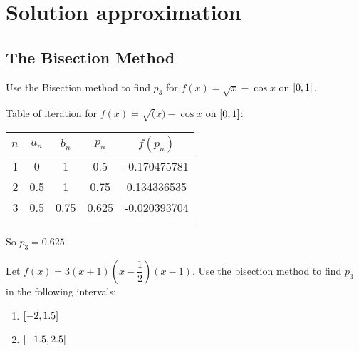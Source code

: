 \documentclass[../../Assignments.tex]{subfiles}
\begin{document}
\chapter{Solution approximation}

\section{The Bisection Method}

\begin{exercise}
    Use the Bisection method to find \(p_3\) for \(f(x) = \sqrt{x} - \cos{x}\) on \(\interval{0}{1}\).
\end{exercise}

\begin{solution}
    Table of iteration for \(f(x) = \sqrt(x) - \cos{x}\) on \(\interval{0}{1}\):

    \begin{tabular}{r S[table-format=1.1] S[table-format=1.2] S[table-format=1.3] S[table-format=-1.9]}
        \\
        \toprule
        \(n\)  &  {\(a_n\)}  &  {\(b_n\)}  &  {\(p_n\)}  &  {\(f(p_n)\)}  \\
          &  0          &  1          &  0.5        &  -0.170475781  \\
            2  &  0.5        &  1          &  0.75       &   0.134336535  \\
            3  &  0.5        &  0.75       &  0.625      &  -0.020393704  \\
        \bottomrule
        \\
    \end{tabular}

    So \(p_3 = \num{0.625}\).
\end{solution}

\begin{exercise}
    Let \(f(x) = 3 (x + 1) (x - \dfrac{1}{2}) (x - 1)\). Use the bisection
    method to find \(p_3\) in the following intervals:

    \begin{enumerate}[label = (\alph*)]
        \item \(\interval{-2}{\num{1.5}}\)
        \item \(\interval{\num{-1.5}}{\num{2.5}}\)
    \end{enumerate}
\end{exercise}
\end{document}
